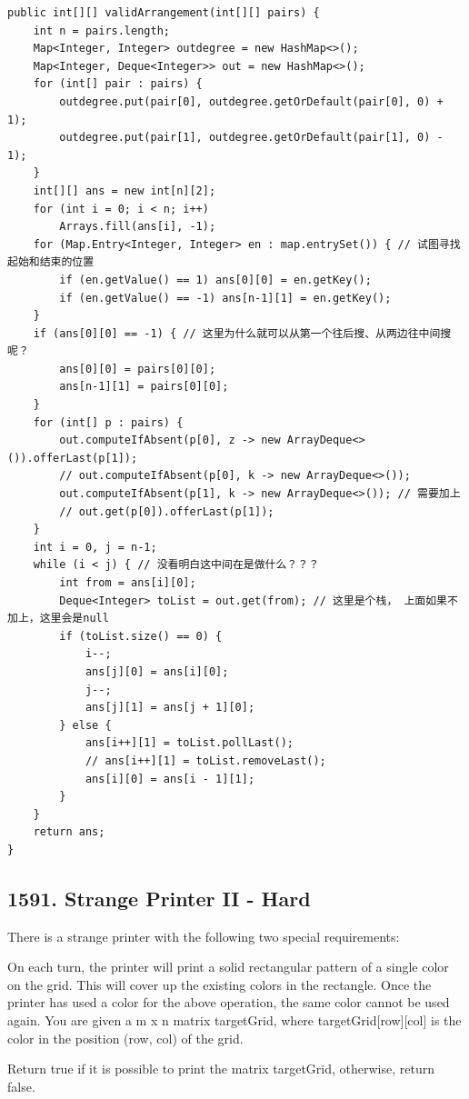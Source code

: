 \documentclass[9pt, b5paaper]{book}
\begin{document}
\begin{enumerate}
\begin{verbatim}
public int[][] validArrangement(int[][] pairs) {
    int n = pairs.length;
    Map<Integer, Integer> outdegree = new HashMap<>();
    Map<Integer, Deque<Integer>> out = new HashMap<>();
    for (int[] pair : pairs) {
        outdegree.put(pair[0], outdegree.getOrDefault(pair[0], 0) + 1);
        outdegree.put(pair[1], outdegree.getOrDefault(pair[1], 0) - 1);
    }
    int[][] ans = new int[n][2];
    for (int i = 0; i < n; i++) 
        Arrays.fill(ans[i], -1);
    for (Map.Entry<Integer, Integer> en : map.entrySet()) { // 试图寻找起始和结束的位置
        if (en.getValue() == 1) ans[0][0] = en.getKey();
        if (en.getValue() == -1) ans[n-1][1] = en.getKey();
    }
    if (ans[0][0] == -1) { // 这里为什么就可以从第一个往后搜、从两边往中间搜呢？
        ans[0][0] = pairs[0][0];
        ans[n-1][1] = pairs[0][0];
    }
    for (int[] p : pairs) {
        out.computeIfAbsent(p[0], z -> new ArrayDeque<>()).offerLast(p[1]);
        // out.computeIfAbsent(p[0], k -> new ArrayDeque<>());
        out.computeIfAbsent(p[1], k -> new ArrayDeque<>()); // 需要加上
        // out.get(p[0]).offerLast(p[1]);
    }
    int i = 0, j = n-1;
    while (i < j) { // 没看明白这中间在是做什么？？？
        int from = ans[i][0];
        Deque<Integer> toList = out.get(from); // 这里是个栈， 上面如果不加上，这里会是null
        if (toList.size() == 0) {
            i--;
            ans[j][0] = ans[i][0];
            j--;
            ans[j][1] = ans[j + 1][0];
        } else {
            ans[i++][1] = toList.pollLast();
            // ans[i++][1] = toList.removeLast();
            ans[i][0] = ans[i - 1][1];
        }
    }
    return ans;
}
\end{verbatim}
\end{enumerate}

\subsection{1591. Strange Printer II - Hard}
\label{sec-1-5-4}
There is a strange printer with the following two special requirements:

On each turn, the printer will print a solid rectangular pattern of a single color on the grid. This will cover up the existing colors in the rectangle.
Once the printer has used a color for the above operation, the same color cannot be used again.
You are given a m x n matrix targetGrid, where targetGrid[row][col] is the color in the position (row, col) of the grid.

Return true if it is possible to print the matrix targetGrid, otherwise, return false.
\end{document}
